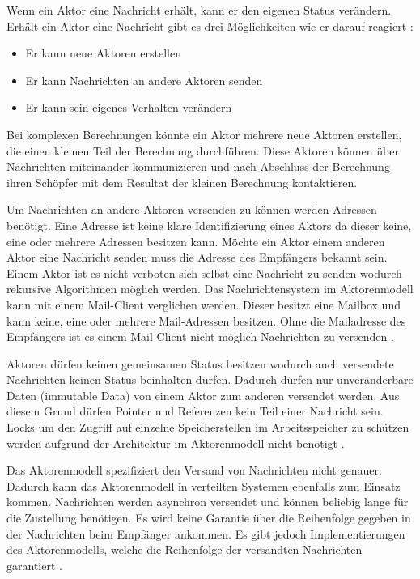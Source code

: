 Wenn ein Aktor eine Nachricht erhält, kann er den eigenen Status verändern. Erhält ein Aktor eine Nachricht gibt es drei Möglichkeiten wie er darauf reagiert \cite[p. 84]{Erb2012}:

\begin{itemize}
  \item Er kann neue Aktoren erstellen
  \item Er kann Nachrichten an andere Aktoren senden
  \item Er kann sein eigenes Verhalten verändern
\end{itemize}

Bei komplexen Berechnungen könnte ein Aktor mehrere neue Aktoren erstellen, die einen kleinen Teil der Berechnung durchführen. Diese Aktoren können über Nachrichten miteinander kommunizieren und nach Abschluss der Berechnung ihren Schöpfer mit dem Resultat der kleinen Berechnung kontaktieren. 

Um Nachrichten an andere Aktoren versenden zu können werden Adressen benötigt. Eine Adresse ist keine klare Identifizierung eines Aktors da dieser keine, eine oder mehrere Adressen besitzen kann. Möchte ein Aktor einem anderen Aktor eine Nachricht senden muss die Adresse des Empfängers bekannt sein. Einem Aktor ist es nicht verboten sich selbst eine Nachricht zu senden wodurch rekursive Algorithmen möglich werden. Das Nachrichtensystem im Aktorenmodell kann mit einem Mail-Client verglichen werden. Dieser besitzt eine Mailbox und kann keine, eine oder mehrere Mail-Adressen besitzen. Ohne die Mailadresse des Empfängers ist es einem Mail Client nicht möglich Nachrichten zu versenden \cite[p. 85]{Erb2012}. 

Aktoren dürfen keinen gemeinsamen Status besitzen wodurch auch versendete Nachrichten keinen Status beinhalten dürfen. Dadurch dürfen nur unveränderbare Daten (immutable Data) von einem Aktor zum anderen versendet werden. Aus diesem Grund dürfen Pointer und Referenzen kein Teil einer Nachricht sein. Locks um den Zugriff auf einzelne Speicherstellen im Arbeitsspeicher zu schützen werden aufgrund der Architektur im Aktorenmodell  nicht benötigt \cite[p. 85]{Erb2012}.

Das Aktorenmodell spezifiziert den Versand von Nachrichten nicht genauer. Dadurch kann das Aktorenmodell in verteilten Systemen ebenfalls zum Einsatz kommen. Nachrichten werden asynchron versendet und können beliebig lange für die Zustellung benötigen. Es wird keine Garantie über die Reihenfolge gegeben in der Nachrichten beim Empfänger ankommen. Es gibt jedoch Implementierungen des Aktorenmodells, welche die Reihenfolge der versandten Nachrichten garantiert \cite[p. 85]{Erb2012}.


